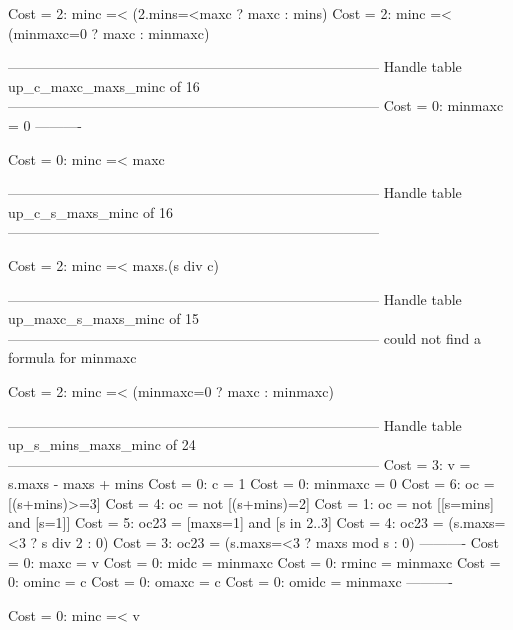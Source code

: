 Cost =  2:  minc =< (2.mins=<maxc ? maxc : mins)
Cost =  2:  minc =< (minmaxc=0 ? maxc : minmaxc)

--------------------------------------------------------------------------------
Handle table up_c_maxc_maxs_minc of 16
--------------------------------------------------------------------------------
Cost =  0:  minmaxc = 0
----------

Cost =  0:  minc =< maxc

--------------------------------------------------------------------------------
Handle table up_c_s_maxs_minc of 16
--------------------------------------------------------------------------------

Cost =  2:  minc =< maxs.(s div c)

--------------------------------------------------------------------------------
Handle table up_maxc_s_maxs_minc of 15
--------------------------------------------------------------------------------
could not find a formula for minmaxc

Cost =  2:  minc =< (minmaxc=0 ? maxc : minmaxc)

--------------------------------------------------------------------------------
Handle table up_s_mins_maxs_minc of 24
--------------------------------------------------------------------------------
Cost =  3:  v       = s.maxs - maxs + mins
Cost =  0:  c       = 1
Cost =  0:  minmaxc = 0
Cost =  6:  oc      = [(s+mins)>=3]
Cost =  4:  oc      = not [(s+mins)=2]
Cost =  1:  oc      = not [[s=mins] and [s=1]]
Cost =  5:  oc23    = [maxs=1] and [s in 2..3]
Cost =  4:  oc23    = (s.maxs=<3 ? s div 2 : 0)
Cost =  3:  oc23    = (s.maxs=<3 ? maxs mod s : 0)
----------
Cost =  0:  maxc    = v
Cost =  0:  midc    = minmaxc
Cost =  0:  rminc   = minmaxc
Cost =  0:  ominc   = c
Cost =  0:  omaxc   = c
Cost =  0:  omidc   = minmaxc
----------

Cost =  0:  minc =< v
